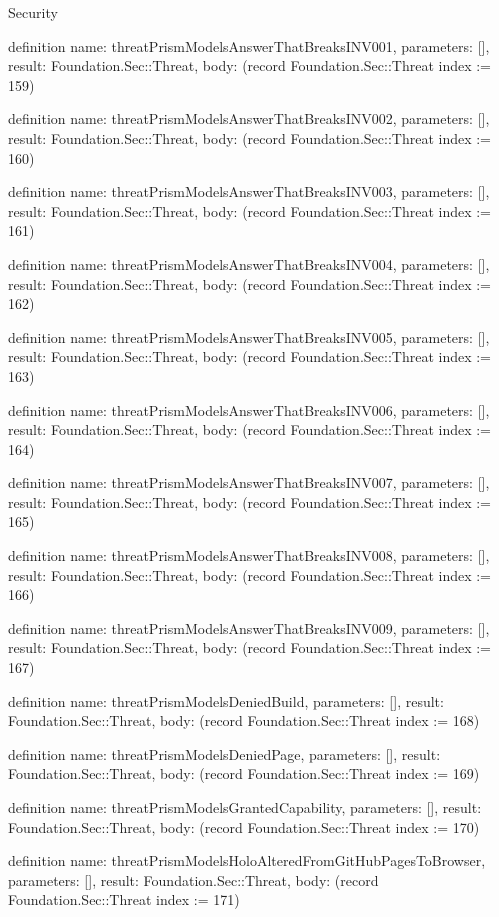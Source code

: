 \begin{lexlean}{Security}
\begin{semanticmodule}
definition{
  name: threatPrismModelsAnswerThatBreaksINV001,
  parameters: [],
  result: Foundation.Sec::Threat,
  body: (record Foundation.Sec::Threat {index := 159})
}

definition{
  name: threatPrismModelsAnswerThatBreaksINV002,
  parameters: [],
  result: Foundation.Sec::Threat,
  body: (record Foundation.Sec::Threat {index := 160})
}

definition{
  name: threatPrismModelsAnswerThatBreaksINV003,
  parameters: [],
  result: Foundation.Sec::Threat,
  body: (record Foundation.Sec::Threat {index := 161})
}

definition{
  name: threatPrismModelsAnswerThatBreaksINV004,
  parameters: [],
  result: Foundation.Sec::Threat,
  body: (record Foundation.Sec::Threat {index := 162})
}

definition{
  name: threatPrismModelsAnswerThatBreaksINV005,
  parameters: [],
  result: Foundation.Sec::Threat,
  body: (record Foundation.Sec::Threat {index := 163})
}

definition{
  name: threatPrismModelsAnswerThatBreaksINV006,
  parameters: [],
  result: Foundation.Sec::Threat,
  body: (record Foundation.Sec::Threat {index := 164})
}

definition{
  name: threatPrismModelsAnswerThatBreaksINV007,
  parameters: [],
  result: Foundation.Sec::Threat,
  body: (record Foundation.Sec::Threat {index := 165})
}

definition{
  name: threatPrismModelsAnswerThatBreaksINV008,
  parameters: [],
  result: Foundation.Sec::Threat,
  body: (record Foundation.Sec::Threat {index := 166})
}

definition{
  name: threatPrismModelsAnswerThatBreaksINV009,
  parameters: [],
  result: Foundation.Sec::Threat,
  body: (record Foundation.Sec::Threat {index := 167})
}

definition{
  name: threatPrismModelsDeniedBuild,
  parameters: [],
  result: Foundation.Sec::Threat,
  body: (record Foundation.Sec::Threat {index := 168})
}

definition{
  name: threatPrismModelsDeniedPage,
  parameters: [],
  result: Foundation.Sec::Threat,
  body: (record Foundation.Sec::Threat {index := 169})
}

definition{
  name: threatPrismModelsGrantedCapability,
  parameters: [],
  result: Foundation.Sec::Threat,
  body: (record Foundation.Sec::Threat {index := 170})
}

definition{
  name: threatPrismModelsHoloAlteredFromGitHubPagesToBrowser,
  parameters: [],
  result: Foundation.Sec::Threat,
  body: (record Foundation.Sec::Threat {index := 171})
}


\end{semanticmodule}
\end{lexlean}
